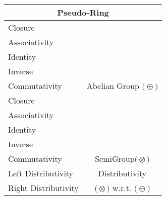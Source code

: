 \documentclass[a4paper,12pt]{scrartcl}    %
\newcommand{\OpA}{\otimes}
\newcommand{\OpB}{\oplus}
\begin{document}
\begin{minipage}[c]{0,5\textwidth}
\vspace{0.6cm}
\begin{tabular}{|l|c|} %
  \hline
  \multicolumn{2}{c}{\cellcolor{green!25}Pseudo-Ring} \\
  \hline
    \cellcolor{blue!25} Closure& \cellcolor{yellow!25}  \\
    \cellcolor{blue!25} Associativity& \cellcolor{yellow!25}  \\
    \cellcolor{blue!25} Identity& \cellcolor{yellow!25} \\
    \cellcolor{blue!25} Inverse& \cellcolor{yellow!25} \\
    \cellcolor{blue!25} Commutativity& \multirow{-5}{*}{\tiny\cellcolor{yellow!25}Abelian Group $\big(\OpB\big)$} \\
   \hline
    \cellcolor{blue!25} Closure& \cellcolor{yellow!25}  \\
    \cellcolor{blue!25} Associativity& \cellcolor{yellow!25}  \\
    \cellcolor{red!25} Identity& \cellcolor{yellow!25} \\
    \cellcolor{red!25} Inverse& \cellcolor{yellow!25} \\
    \cellcolor{red!25} Commutativity& \multirow{-5}{*}{\tiny\cellcolor{yellow!25}SemiGroup$\big(\OpA\big)$} \\
  \hline
  	\cellcolor{blue!25} Left Distributivity&  \tiny\cellcolor{yellow!25}Distributivity\\
    \cellcolor{blue!25} Right Distributivity & \tiny\cellcolor{yellow!25} $\big(\OpA\big)$ w.r.t. $\big(\OpB\big)$  \\
   \hline
\end{tabular}

\end{minipage}
\end{document}
